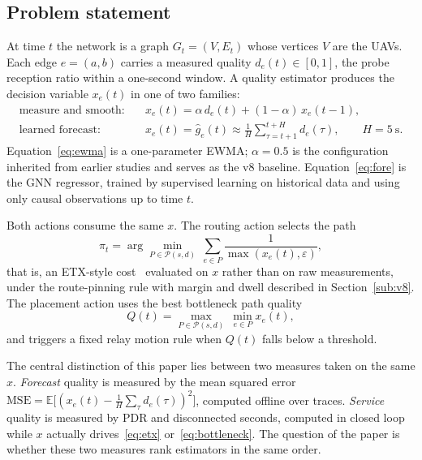 \subsection{Problem statement}
At time $t$ the network is a graph $G_t=(V,E_t)$ whose vertices $V$ are the
UAVs. Each edge $e=(a,b)$ carries a measured quality $d_e(t)\in[0,1]$, the probe
reception ratio within a one-second window. A quality estimator produces the
decision variable $x_e(t)$ in one of two families:
\begin{align}
\text{measure and smooth:}\quad & x_e(t)=\alpha\, d_e(t)+(1-\alpha)\,x_e(t-1),\label{eq:ewma}\\
\text{learned forecast:}\quad & x_e(t)=\hat g_e(t)\approx
\frac{1}{H}\sum_{\tau=t+1}^{t+H} d_e(\tau),\qquad H=5\ \text{s}.\label{eq:fore}
\end{align}
Equation~\eqref{eq:ewma} is a one-parameter EWMA; $\alpha=0.5$ is the
configuration inherited from earlier studies and serves as the v8 baseline.
Equation~\eqref{eq:fore} is the GNN regressor, trained by supervised learning on
historical data and using only causal observations up to time $t$.

Both actions consume the same $x$. The routing action selects the path
\begin{equation}
\pi_t=\arg\min_{P\in\mathcal{P}(s,d)}\ \sum_{e\in P}\frac{1}{\max(x_e(t),\varepsilon)},
\label{eq:etx}
\end{equation}
that is, an ETX-style cost~\cite{decouto} evaluated on $x$ rather than on raw
measurements, under the route-pinning rule with margin and dwell described in
Section~\ref{sub:v8}. The placement action uses the best bottleneck path quality
\begin{equation}
Q(t)=\max_{P\in\mathcal{P}(s,d)}\ \min_{e\in P} x_e(t),
\label{eq:bottleneck}
\end{equation}
and triggers a fixed relay motion rule when $Q(t)$ falls below a threshold.

The central distinction of this paper lies between two measures taken on the
same $x$. \emph{Forecast} quality is measured by the mean squared error
$\mathrm{MSE}=\mathbb{E}\big[(x_e(t)-\frac{1}{H}\sum_\tau d_e(\tau))^2\big]$,
computed offline over traces. \emph{Service} quality is measured by PDR and
disconnected seconds, computed in closed loop while $x$ actually
drives~\eqref{eq:etx} or~\eqref{eq:bottleneck}. The question of the paper is
whether these two measures rank estimators in the same order.

